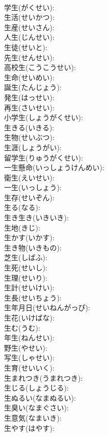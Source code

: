 \documentclass[8pt]{extreport}
\begin{document}
\begin{CJK}{UTF8}{min}
\\	学生(がくせい): 
\\	生活(せいかつ): 
\\	生産(せいさん): 
\\	人生(じんせい): 
\\	生徒(せいと): 
\\	先生(せんせい): 
\\	高校生(こうこうせい): 
\\	生命(せいめい): 
\\	誕生(たんじょう): 
\\	発生(はっせい): 
\\	再生(さいせい): 
\\	小学生(しょうがくせい): 
\\	生きる(いきる): 
\\	生物(せいぶつ): 
\\	生涯(しょうがい): 
\\	留学生(りゅうがくせい): 
\\	一生懸命(いっしょうけんめい): 
\\	衛生(えいせい): 
\\	一生(いっしょう): 
\\	生存(せいぞん): 
\\	生る(なる): 
\\	生き生き(いきいき): 
\\	生地(きじ): 
\\	生かす(いかす): 
\\	生き物(いきもの): 
\\	芝生(しばふ): 
\\	生死(せいし): 
\\	生理(せいり): 
\\	生計(せいけい): 
\\	生長(せいちょう): 
\\	生年月日(せいねんがっぴ): 
\\	生花(いけばな): 
\\	生む(うむ): 
\\	年生(ねんせい): 
\\	野生(やせい): 
\\	写生(しゃせい): 
\\	生育(せいいく): 
\\	生まれつき(うまれつき): 
\\	生じる(しょうじる): 
\\	生ぬるい(なまぬるい): 
\\	生臭い(なまぐさい): 
\\	生意気(なまいき): 
\\	生やす(はやす): 

\end{CJK}
\end{document}

